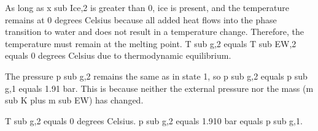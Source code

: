 As long as x sub Ice,2 is greater than 0, ice is present, and the temperature remains at 0 degrees Celsius because all added heat flows into the phase transition to water and does not result in a temperature change. Therefore, the temperature must remain at the melting point. T sub g,2 equals T sub EW,2 equals 0 degrees Celsius due to thermodynamic equilibrium.  

The pressure p sub g,2 remains the same as in state 1, so p sub g,2 equals p sub g,1 equals 1.91 bar. This is because neither the external pressure nor the mass (m sub K plus m sub EW) has changed.  

T sub g,2 equals 0 degrees Celsius.  
p sub g,2 equals 1.910 bar equals p sub g,1.